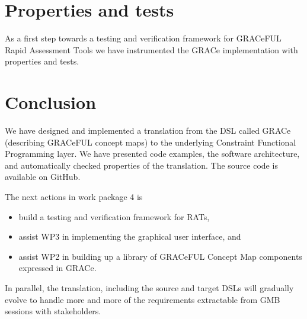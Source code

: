 \documentclass{article}
\begin{document}



\section{Properties and tests}

As a first step towards a testing and verification framework for
GRACeFUL Rapid Assessment Tools we have instrumented the GRACe
implementation with properties and tests.
%


\section{Conclusion}
\label{sec:conclusion}

We have designed and implemented a translation from the DSL called
GRACe (describing GRACeFUL concept maps) to the underlying Constraint
Functional Programming layer.
%
We have presented code examples, the software architecture, and
automatically checked properties of the translation.
%
The source code is available on GitHub.

The next actions in work package 4 is
\begin{itemize}
\item build a testing and verification framework for RATs,
\item assist WP3 in implementing the graphical user interface, and
\item assist WP2 in building up a library of GRACeFUL Concept Map
  components expressed in GRACe.
\end{itemize}
%
In parallel, the translation, including the source and target DSLs
will gradually evolve to handle more and more of the requirements
extractable from GMB sessions with stakeholders.

\appendix





\end{document}
